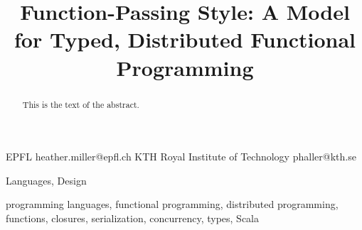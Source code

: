 \documentclass[preprint]{sigplanconf}
\theoremstyle{definition}
\theoremstyle{definition}
\begin{document}
\setlength{\pdfpageheight}{\paperheight}
\setlength{\pdfpagewidth}{\paperwidth}

\setmainfont[Mapping=tex-text]{Times New Roman}
\setmonofont[Scale=0.8,BoldFont={Consolas Bold}]{Consolas}






\title{Function-Passing Style: A Model for Typed, Distributed Functional Programming}

           {EPFL}
           {heather.miller@epfl.ch}
           {KTH Royal Institute of Technology}
           {phaller@kth.se}

\maketitle

\begin{abstract}
This is the text of the abstract.
\end{abstract}


\terms
Languages, Design

\keywords
programming languages, functional programming, distributed programming,
functions, closures, serialization, concurrency, types, Scala
\end{document}
